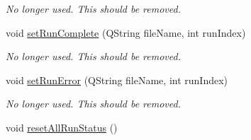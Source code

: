 \begin{DoxyCompactItemize}
\begin{DoxyCompactList}\small\item\em No longer used. This should be removed. \end{DoxyCompactList}\item 
\hypertarget{class_picto_1_1_run_selector_widget_ac975819463401d72fa6e08b0c8c6cb46}{void \hyperlink{class_picto_1_1_run_selector_widget_ac975819463401d72fa6e08b0c8c6cb46}{set\-Run\-Complete} (Q\-String file\-Name, int run\-Index)}\label{class_picto_1_1_run_selector_widget_ac975819463401d72fa6e08b0c8c6cb46}

\begin{DoxyCompactList}\small\item\em No longer used. This should be removed. \end{DoxyCompactList}\item 
\hypertarget{class_picto_1_1_run_selector_widget_a9f06098fccc3aa775e87a41fc6d45e4f}{void \hyperlink{class_picto_1_1_run_selector_widget_a9f06098fccc3aa775e87a41fc6d45e4f}{set\-Run\-Error} (Q\-String file\-Name, int run\-Index)}\label{class_picto_1_1_run_selector_widget_a9f06098fccc3aa775e87a41fc6d45e4f}

\begin{DoxyCompactList}\small\item\em No longer used. This should be removed. \end{DoxyCompactList}\item 
\hypertarget{class_picto_1_1_run_selector_widget_a8c21deac73e7d1887abf0c13392fc465}{void \hyperlink{class_picto_1_1_run_selector_widget_a8c21deac73e7d1887abf0c13392fc465}{reset\-All\-Run\-Status} ()}\label{class_picto_1_1_run_selector_widget_a8c21deac73e7d1887abf0c13392fc465}


\end{DoxyCompactItemize}

